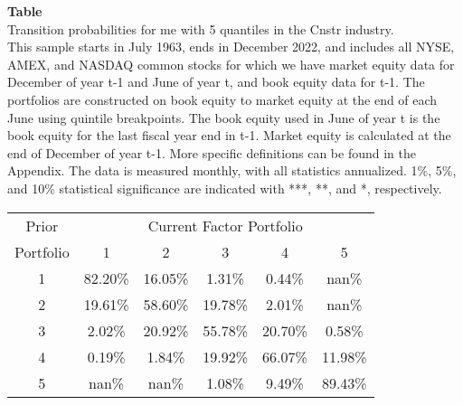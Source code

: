 \begin{table*}[ht!]
\raggedright
{}
\label{tab: transition_probs_me_Cnstr_with_5_quantiles}
\textbf{Table \thetable} \\
Transition probabilities for me with 5 quantiles in the Cnstr industry. \\
\hspace*{1em}This sample starts in July 1963, ends in December 2022, and includes all NYSE, AMEX, and NASDAQ common stocks for which we have market equity data for December of year t-1 and June of year t, and book equity data for t-1. The portfolios are constructed on book equity to market equity at the end of each June using quintile breakpoints.  The book equity used in June of year t is the book equity for the last fiscal year end in t-1.  Market equity is calculated at the end of December of year t-1.  More specific definitions can be found in the Appendix.  The data is measured monthly, with all statistics annualized.  1\%, 5\%, and 10\% statistical significance are indicated with ***, **, and *, respectively. \\
\vspace{0.5em}
\centering
\begin{adjustbox}{max width=\textwidth}
\begin{tabular}{@{}cccccc@{}}
\toprule
Prior & \multicolumn{5}{c}{Current Factor Portfolio} \\
Portfolio & 1 & 2 & 3 & 4 & 5 \\
\midrule
1 & 82.20\% & 16.05\% & 1.31\% & 0.44\% & nan\% \\
2 & 19.61\% & 58.60\% & 19.78\% & 2.01\% & nan\% \\
3 & 2.02\% & 20.92\% & 55.78\% & 20.70\% & 0.58\% \\
4 & 0.19\% & 1.84\% & 19.92\% & 66.07\% & 11.98\% \\
5 & nan\% & nan\% & 1.08\% & 9.49\% & 89.43\% \\
\bottomrule
\end{tabular}
\end{adjustbox}
\end{table*}